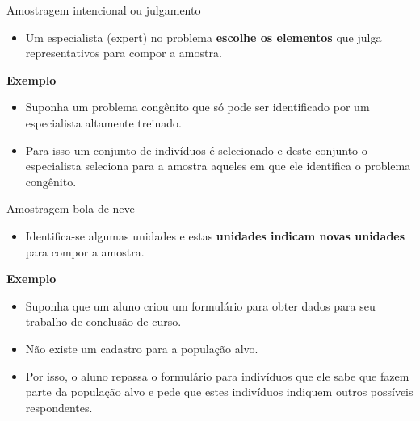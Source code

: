 \documentclass[
  ignorenonframetext,
  serif,
  professionalfont,
  usenames,
  dvipsnames,
  aspectratio = 169]{beamer}
\providecommand{\tightlist}{%
  \setlength{\itemsep}{0pt}\setlength{\parskip}{0pt}}
\renewcommand{\tightlist}{%
  \setlength{\itemsep}{0\baselineskip}
  \setlength{\parskip}{0.25\baselineskip}
}
\begin{document}
\begin{frame}{Amostragem intencional ou julgamento}
\protect\hypertarget{amostragem-intencional-ou-julgamento}{}
\begin{itemize}
\tightlist
\item
  Um especialista (expert) no problema \textbf{escolhe os elementos} que
  julga representativos para compor a amostra.
\end{itemize}

\textbf{Exemplo}

\begin{itemize}
\item
  Suponha um problema congênito que só pode ser identificado por um
  especialista altamente treinado.
\item
  Para isso um conjunto de indivíduos é selecionado e deste conjunto o
  especialista seleciona para a amostra aqueles em que ele identifica o
  problema congênito.
\end{itemize}
\end{frame}

\begin{frame}{Amostragem bola de neve}
\protect\hypertarget{amostragem-bola-de-neve}{}
\begin{itemize}
\tightlist
\item
  Identifica-se algumas unidades e estas
  \textbf{unidades indicam novas unidades} para compor a amostra.
\end{itemize}

\textbf{Exemplo}

\begin{itemize}
\item
  Suponha que um aluno criou um formulário para obter dados para seu
  trabalho de conclusão de curso.
\item
  Não existe um cadastro para a população alvo.
\item
  Por isso, o aluno repassa o formulário para indivíduos que ele sabe
  que fazem parte da população alvo e pede que estes indivíduos indiquem
  outros possíveis respondentes.
\end{itemize}
\end{frame}
\end{document}
